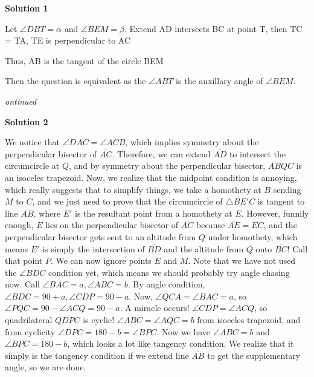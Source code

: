 \begin{enumerate}
 



\textbf{Solution 1}

Let $\angle DBT = \alpha$ and $\angle BEM = \beta$.  Extend AD intersects BC at point T, then TC = TA, TE is perpendicular to AC

 Thus, AB is the tangent of the circle BEM

 Then the question is equivalent as  the $\angle ABT$ is the auxillary angle of $\angle BEM$.

 \textit{ontinued}

 



\textbf{Solution 2}

We notice that $\angle DAC = \angle ACB$, which implies symmetry about the perpendicular bisector of $\overline{AC}$. Therefore, we can extend $\overline{AD}$ to intersect the circumcircle at $Q$, and by symmetry about the perpendicular bisector, $ABQC$ is an isoceles trapezoid. Now, we realize that the midpoint condition is annoying, which really suggests that to simplify things, we take a homothety at $B$ sending $M$ to $C$, and we just need to prove that the circumcircle of $\triangle BE'C$ is tangent to line $\overline{AB}$, where $E'$ is the resultant point from a homothety at $E$. However, funnily enough, $E$ lies on the perpendicular bisector of $\overline{AC}$ because $\overline{AE}=\overline{EC}$, and the perpendicular bisector gets sent to an altitude from $Q$ under homothety, which means $E'$ is simply the intersection of $\overline{BD}$ and the altitude from $Q$ onto $\overline{BC}$! Call that point $P$. We can now ignore points $E$ and $M$. Note that we have not used the $\angle BDC$ condition yet, which means we should probably try angle chasing now. Call $\angle BAC=a, \angle ABC = b$. By angle condition, $\angle BDC = 90+a, \angle CDP = 90-a$. Now, $\angle QCA = \angle BAC = a$, so $\angle PQC = 90 - \angle ACQ = 90-a$. A miracle occurs! $\angle CDP = \angle ACQ$, so quadrilateral $QDPC$ is cyclic! $\angle ABC = \angle AQC = b$ from isoceles trapezoid, and from cyclicity $\angle DPC = 180-b = \angle BPC$. Now we have $\angle ABC = b$ and $\angle BPC = 180-b$, which looks a lot like tangency condition. We realize that it simply is the tangency condition if we extend line $\overline{AB}$ to get the supplementary angle, so we are done.

 


\end{enumerate}